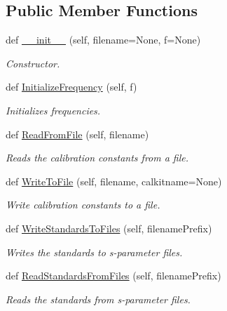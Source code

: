 \subsection*{Public Member Functions}
\begin{DoxyCompactItemize}
\item 
def \hyperlink{classSignalIntegrity_1_1Measurement_1_1CalKit_1_1CalibrationKit_1_1CalibrationKit_a7c969c556643c62769436aaee9bee342}{\+\_\+\+\_\+init\+\_\+\+\_\+} (self, filename=None, f=None)
\begin{DoxyCompactList}\small\item\em Constructor. \end{DoxyCompactList}\item 
def \hyperlink{classSignalIntegrity_1_1Measurement_1_1CalKit_1_1CalibrationKit_1_1CalibrationKit_a068ffbf43377a9e28cccb8b6013772ea}{Initialize\+Frequency} (self, f)
\begin{DoxyCompactList}\small\item\em Initializes frequencies. \end{DoxyCompactList}\item 
def \hyperlink{classSignalIntegrity_1_1Measurement_1_1CalKit_1_1CalibrationKit_1_1CalibrationKit_a3dc78f8134b7196685f6b0b5ace5e33b}{Read\+From\+File} (self, filename)
\begin{DoxyCompactList}\small\item\em Reads the calibration constants from a file. \end{DoxyCompactList}\item 
def \hyperlink{classSignalIntegrity_1_1Measurement_1_1CalKit_1_1CalibrationKit_1_1CalibrationKit_ac68713cc133371d7a733dd318b5669d3}{Write\+To\+File} (self, filename, calkitname=None)
\begin{DoxyCompactList}\small\item\em Write calibration constants to a file. \end{DoxyCompactList}\item 
def \hyperlink{classSignalIntegrity_1_1Measurement_1_1CalKit_1_1CalibrationKit_1_1CalibrationKit_ab30dce63eb90ca31d9bea9036710996a}{Write\+Standards\+To\+Files} (self, filename\+Prefix)
\begin{DoxyCompactList}\small\item\em Writes the standards to s-\/parameter files. \end{DoxyCompactList}\item 
def \hyperlink{classSignalIntegrity_1_1Measurement_1_1CalKit_1_1CalibrationKit_1_1CalibrationKit_a749305349102d6e6bfd1babeb152046f}{Read\+Standards\+From\+Files} (self, filename\+Prefix)
\begin{DoxyCompactList}\small\item\em Reads the standards from s-\/parameter files. \end{DoxyCompactList}\end{DoxyCompactItemize}
